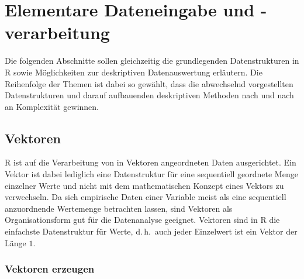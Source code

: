 \chapter{Elementare Dateneingabe und -verarbeitung}
\label{sec:basics}

Die folgenden Abschnitte sollen gleichzeitig die grundlegenden Datenstrukturen in R sowie Möglichkeiten zur deskriptiven Datenauswertung erläutern. Die Reihenfolge der Themen ist dabei so gewählt, dass die abwechselnd vorgestellten Datenstrukturen und darauf aufbauenden deskriptiven Methoden nach und nach an Komplexität gewinnen.

\section{Vektoren}

R ist auf die Verarbeitung von in Vektoren angeordneten Daten ausgerichtet. Ein Vektor ist dabei lediglich eine Datenstruktur für eine sequentiell geordnete Menge einzelner Werte und nicht mit dem mathematischen Konzept eines Vektors zu verwechseln. Da sich empirische Daten einer Variable meist als eine sequentiell anzuordnende Wertemenge betrachten lassen, sind Vektoren als Organisationsform gut für die Datenanalyse geeignet. Vektoren sind in R die einfachste Datenstruktur für Werte, d.\,h.\ auch jeder Einzelwert ist ein Vektor der Länge $1$.

\subsection{Vektoren erzeugen}
\label{sec:vector}

